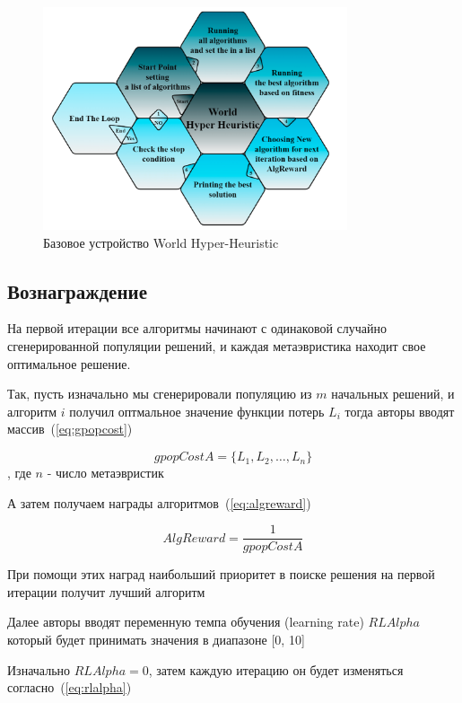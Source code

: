 \documentclass[a4paper,12pt]{extarticle}
\begin{document}
\begin{figure}
	\centering
	\includegraphics[width=0.8\textwidth]{basic_whh.png}
	\caption{Базовое устройство World Hyper-Heuristic}
	\label{fig:basic_whh}
\end{figure}

\subsection{Вознаграждение}

На первой итерации все алгоритмы начинают с одинаковой случайно сгенерированной популяции решений, и каждая метаэвристика находит свое оптимальное решение. 

Так, пусть изначально мы сгенерировали популяцию из $m$ начальных решений, и алгоритм $i$ получил оптмальное значение функции потерь $L_i$ тогда авторы вводят массив~(\ref{eq:gpopcost})

\begin{equation}
	\label{eq:gpopcost}
		gpopCostA = \{L_1, L_2, \ldots, L_n\}
\end{equation}, где $n$ - число метаэвристик

А затем получаем награды алгоритмов~(\ref{eq:algreward})

\begin{equation}
	\label{eq:algreward}
		AlgReward = \frac{1}{gpopCostA}
\end{equation}

При помощи этих наград наибольший приоритет в поиске решения на первой итерации получит лучший алгоритм

Далее авторы вводят переменную темпа обучения (learning rate) $RLAlpha$ который будет принимать значения в диапазоне [0, 10]

Изначально $RLAlpha = 0$, затем каждую итерацию он будет изменяться согласно~(\ref{eq:rlalpha})
\end{document}
